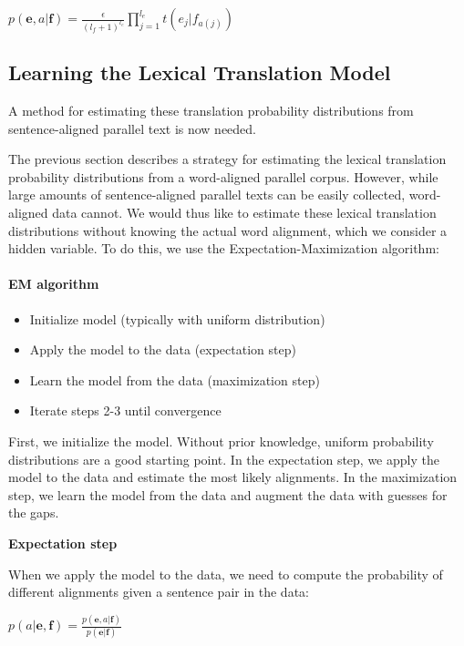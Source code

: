 \documentclass[11pt]{report}
\theoremstyle{plain}
\begin{document}
{\begin{center}
$p(\textbf{e},a|\textbf{f}) = \frac{\epsilon}{(l_f +
1)^{l_e}}\prod_{j=1}^{l_e} t(e_j|f_{a(j)})$
\end{center}


\subsection{Learning the Lexical Translation Model}

A method for estimating these translation probability distributions
from sentence-aligned parallel text is now needed.

The previous section describes a strategy for estimating the lexical
translation probability distributions from a word-aligned parallel
corpus. However, while large amounts of sentence-aligned parallel
texts can be easily collected, word-aligned data cannot. We would
thus like to estimate these lexical translation distributions
without knowing the actual word alignment, which we consider a
hidden variable. To do this, we use the Expectation-Maximization
algorithm:

\paragraph{EM algorithm}
\begin{itemize}
\item{Initialize model (typically with uniform distribution)}
\item{Apply the model to the data (expectation step)}
\item{Learn the model from the data (maximization step)}
\item{Iterate steps 2-3 until convergence}
\end{itemize}

First, we initialize the model. Without prior knowledge, uniform
probability distributions are a good starting point. In the
expectation step, we apply the model to the data and estimate the
most likely alignments. In the maximization step, we learn the model
from the data and augment the data with guesses for the gaps.

 \textbf{Expectation step}

When we apply the model to the data, we need to compute the
probability of different alignments given a sentence pair in the
data:

\begin{center}
$p(a|\textbf{e},\textbf{f}) =
\frac{p(\textbf{e},a|\textbf{f})}{p(\textbf{e}|\textbf{f})}$
\end{center}

}
\end{document}
